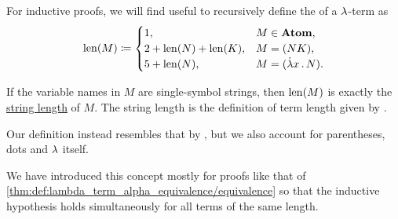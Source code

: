 \begin{definition}\label{def:lambda_term_length}\mimprovised
  For inductive proofs, we will find useful to recursively define the  of a \( {\mathrm \lambda} \)-term as
  \begin{equation*}
    \len(M) \coloneqq \begin{cases}
      1,                     &M \in \op*{Atom}, \\
      2 + \len(N) + \len(K), &M = (NK), \\
      5 + \len(N),           &M = (\qabs x N). \\
    \end{cases}
  \end{equation*}
\end{definition}
\begin{comments}
  \item If the variable names in \( M \) are single-symbol strings, then \( \operatorname{len}(M) \) is exactly the \hyperref[def:formal_language/string_length]{string length} of \( M \). The string length is the definition of term length given by .

  Our definition instead resembles that by , but we also account for parentheses, dots and \( {\mathrm \lambda} \) itself.

  \item We have introduced this concept mostly for proofs like that of \cref{thm:def:lambda_term_alpha_equivalence/equivalence} so that the inductive hypothesis holds simultaneously for all terms of the same length.
\end{comments}

